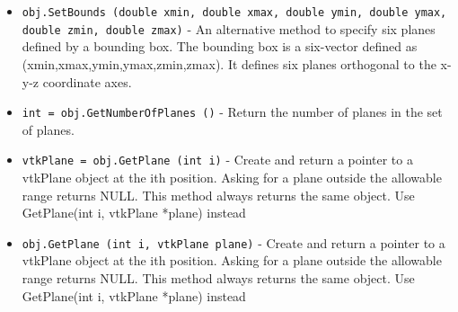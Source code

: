 \begin{itemize}
\item  \verb|obj.SetBounds (double xmin, double xmax, double ymin, double ymax, double zmin, double zmax)| -  An alternative method to specify six planes defined by a bounding box.
 The bounding box is a six-vector defined as (xmin,xmax,ymin,ymax,zmin,zmax).
 It defines six planes orthogonal to the x-y-z coordinate axes.

\item  \verb|int = obj.GetNumberOfPlanes ()| -  Return the number of planes in the set of planes.

\item  \verb|vtkPlane = obj.GetPlane (int i)| -  Create and return a pointer to a vtkPlane object at the ith
 position. Asking for a plane outside the allowable range returns NULL.
 This method always returns the same object. 
 Use GetPlane(int i, vtkPlane *plane) instead

\item  \verb|obj.GetPlane (int i, vtkPlane plane)| -  Create and return a pointer to a vtkPlane object at the ith
 position. Asking for a plane outside the allowable range returns NULL.
 This method always returns the same object. 
 Use GetPlane(int i, vtkPlane *plane) instead

\end{itemize}
